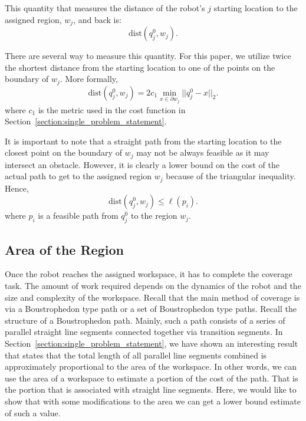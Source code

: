\documentclass[../main.tex]{subfiles}
\begin{document}
This quantity that measures the distance of the robot's $j$ starting location to the assigned region, $w_j$, and back is:
\begin{equation}
	\text{dist}(q^0_j,w_j).
\end{equation}

There are several way to measure this quantity. For this paper, we utilize twice the shortest distance from the starting location to one of the points on the boundary of $w_j$. More formally, 
\begin{equation}
	\text{dist}(q^0_j,w_j)=2c_1\min_{x\in\partial w_j}||q^0_j-x||_2.
\end{equation}
where $c_1$ is the metric used in the cost function in Section~\ref{section:single_problem_statement}.

It is important to note that a straight path from the starting location to the closest point on the boundary of $w_j$ may not be always feasible as it may intersect an obstacle. However, it is clearly a lower bound on the cost of the actual path to get to the assigned region $w_j$ because of the triangular inequality. Hence,
\begin{equation}
	\text{dist}(q^0_j,w_j)\leq\ell(p_i).
\end{equation}
where $p_i$ is a feasible path from $q^0_j$ to the region $w_j$.


\subsection{Area of the Region}

Once the robot reaches the assigned workspace, it has to complete the coverage task. The amount of work required depends on the dynamics of the robot and the size and complexity of the workspace. Recall that the main method of coverage is via a Boustrophedon type path or a set of Boustrophedon type paths. Recall the structure of a Boustrophedon path. Mainly, such a path consists of a series of parallel straight line segments connected together via transition segments. In Section~\ref{section:single_problem_statement}, we have shown an interesting result that states that the total length of all parallel line segments combined is approximately proportional to the area of the workspace. In other words, we can use the area of a workspace to estimate a portion of the cost of the path. That is the portion that is associated with straight line segments. Here, we would like to show that with some modifications to the area we can get a lower bound estimate of such a value.
\end{document}

